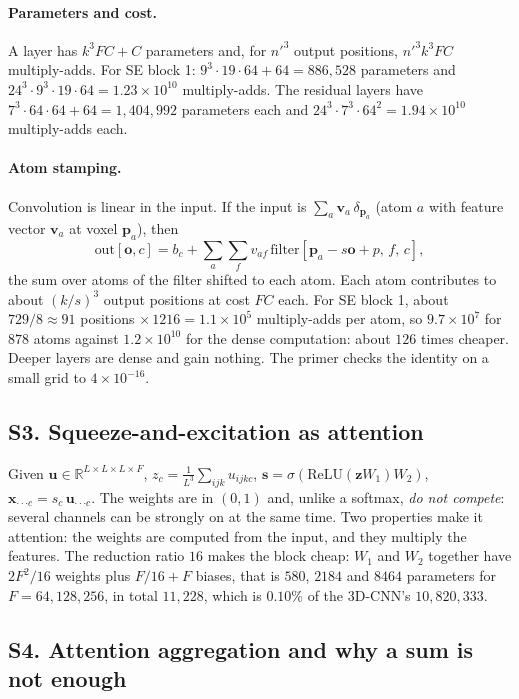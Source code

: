 \documentclass[11pt]{article}
\newcommand{\R}{\mathbb{R}}
\begin{document}
\paragraph{Parameters and cost.} A layer has $k^3FC+C$ parameters and, for $n'^3$ output positions, $n'^3k^3FC$ multiply-adds. For SE block 1: $9^3\cdot19\cdot64+64=886{,}528$ parameters and $24^3\cdot9^3\cdot19\cdot64=1.23\times10^{10}$ multiply-adds. The residual layers have $7^3\cdot64\cdot64+64=1{,}404{,}992$ parameters each and $24^3\cdot7^3\cdot64^2=1.94\times10^{10}$ multiply-adds each.

\paragraph{Atom stamping.} Convolution is linear in the input. If the input is $\sum_a\mathbf v_a\,\delta_{\mathbf p_a}$ (atom $a$ with feature vector $\mathbf v_a$ at voxel $\mathbf p_a$), then
\[
  \text{out}[\mathbf o,c]=b_c+\sum_a\sum_f v_{af}\,\text{filter}[\mathbf p_a-s\mathbf o+p,\,f,\,c],
\]
the sum over atoms of the filter shifted to each atom. Each atom contributes to about $(k/s)^3$ output positions at cost $FC$ each. For SE block 1, about $729/8\approx91$ positions $\times\,1216=1.1\times10^{5}$ multiply-adds per atom, so $9.7\times10^{7}$ for $878$ atoms against $1.2\times10^{10}$ for the dense computation: about $126$ times cheaper. Deeper layers are dense and gain nothing. The primer checks the identity on a small grid to $4\times10^{-16}$.

\label{sec:S3}
\subsection*{S3. Squeeze-and-excitation as attention}
Given $\mathbf u\in\R^{L\times L\times L\times F}$, $z_c=\frac1{L^3}\sum_{ijk}u_{ijkc}$, $\mathbf s=\sigma(\mathrm{ReLU}(\mathbf zW_1)W_2)$, $\mathbf x_{\cdot\cdot\cdot c}=s_c\,\mathbf u_{\cdot\cdot\cdot c}$. The weights are in $(0,1)$ and, unlike a softmax, \emph{do not compete}: several channels can be strongly on at the same time. Two properties make it attention: the weights are computed from the input, and they multiply the features. The reduction ratio $16$ makes the block cheap: $W_1$ and $W_2$ together have $2F^2/16$ weights plus $F/16+F$ biases, that is $580$, $2184$ and $8464$ parameters for $F=64,128,256$, in total $11{,}228$, which is $0.10\%$ of the 3D-CNN's $10{,}820{,}333$.

\label{sec:S4}
\subsection*{S4. Attention aggregation and why a sum is not enough}
\end{document}
